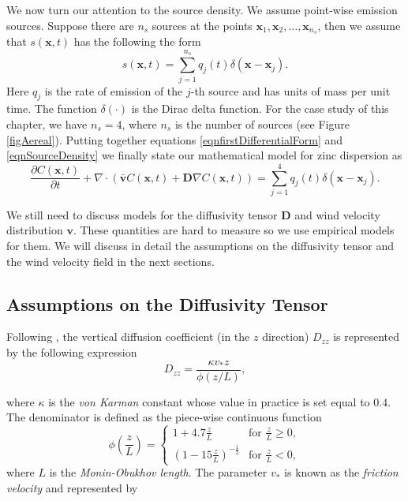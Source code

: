 \documentclass{sfuthesis}
\newcommand{\x}{\textbf{x}}
\newcommand{\vv}{\textbf{v}}
\newcommand{\dv}{\nabla\cdot}
\begin{document}
We now turn our attention to the source density. We assume point-wise emission sources. Suppose there are $n_s$ sources 
 at the points $\x_{1},\x_{2},\ldots,\x_{n_s}$,
then we assume that $s(\x,t)$ has the following the form
\begin{equation}\label{eqnSourceDensity}
s(\x,t)=\sum_{j=1}^{n_s}q_{j}(t)\delta(\x-\x_{j}).
\end{equation}
Here $q_{j}$ is  the  rate of emission of the $j$-th source and has units of mass per unit time. 
The function $\delta(\cdot)$ is the Dirac delta function. For the case study of this chapter, we have $n_s=4$, where $n_s$ is
the number of  sources 
(see Figure \ref{figAereal}). Putting together equations \eqref{eqnfirstDifferentialForm} and \eqref{eqnSourceDensity}
we finally state our mathematical model for zinc dispersion as
\begin{equation}\label{eqnDifussivityFinalForm}
\frac{\partial C(\x,t)}{\partial t}+\dv(\bar{\vv}C(\x,t)+\textbf{D}\nabla C(\x,t))=\sum_{j=1}^{4}q_{j}(t)\delta(\x-\x_{j}).
\end{equation}


We still need to discuss models for the diffusivity tensor $\textbf{D}$ and wind velocity distribution $\vv$. 
These quantities are hard to measure so we use empirical models for them. We will discuss in detail
the assumptions on the diffusivity tensor and the wind velocity field in the next sections. 




\subsection{Assumptions on the Diffusivity Tensor}
Following \cite{monin1954basic},  the vertical diffusion coefficient (in the $z$ direction) $D_{zz}$ is represented by the following expression
\begin{equation}\label{eqnEddyVertical}
D_{zz}=\frac{\kappa v_{*} z}{\phi(z/L)},
\end{equation}

\noindent where $\kappa$ is the \textit{von Karman} constant whose value in practice is set equal to $0.4$. The denominator
is defined as the piece-wise continuous function
\begin{equation*}
\phi\left(\frac{z}{L}\right)=\left\{
			\begin{array}{ll}				
				1+4.7\frac{z}{L} &\mbox{for }\frac{z}{L}\geq 0, \\
				(1-15\frac{z}{L})^{-\frac{1}{2}}&\mbox{for }\frac{z}{L}<0,
			\end{array}
		\right.
\end{equation*}
where $L$ is  the \textit{Monin-Obukhov length}. The parameter $v_{*}$ is known as 
the \textit{friction velocity} and represented by
\end{document}
